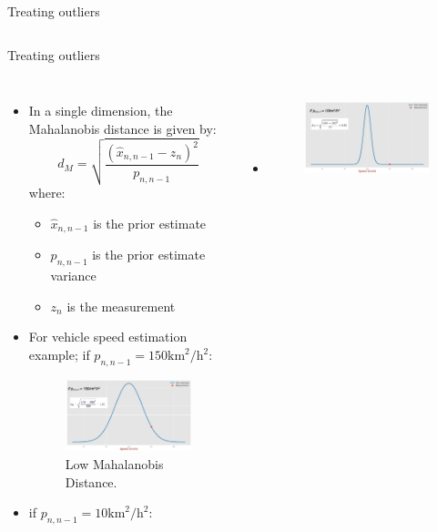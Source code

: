 \begin{frame}{Treating outliers}
\begin{columns}
\end{columns}
\end{frame}

\begin{frame}{Treating outliers}
\begin{columns}
    \begin{itemize}
        \item In a single dimension, the Mahalanobis distance is given by:
        \[
        d_M = \sqrt{\frac{(\hat{x}_{n,n-1} - z_n)^2}{p_{n,n-1}}}
        \]
        where:
        \begin{itemize}
            \item \( \hat{x}_{n,n-1} \) is the prior estimate
            \item \( p_{n,n-1} \) is the prior estimate variance
            \item \( z_n \) is the measurement
        \end{itemize}
        \item For vehicle speed estimation example; if $p_{n,n-1} = 150 \text{km}^2/\text{h}^2$:
        \begin{figure}
            \centering
            \includegraphics[width=0.7\linewidth]{Figures//Part3/LowMahalanobisDistrance.png}
            \vspace{-10pt}
            \caption{Low Mahalanobis Distance.}
            \vspace{-10pt}
        \end{figure}
        \item if $p_{n,n-1} = 10 \text{km}^2/\text{h}^2$:
        \end{itemize}    
    \begin{itemize}
        \item 
        \begin{figure}[!t]
            \centering
            \includegraphics[width=0.7\linewidth]{Figures//Part4/HighMahalanobisDistance.png}

\end{figure}
\end{itemize}
\end{columns}
\end{frame}
